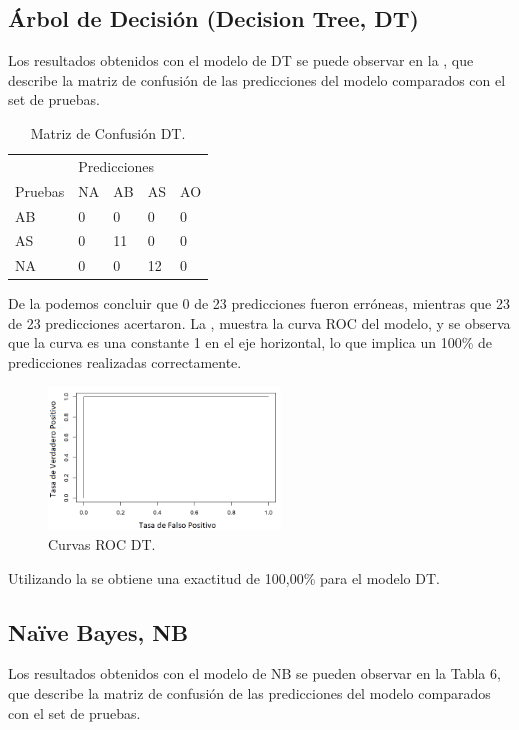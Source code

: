 \documentclass[spanish]{textolivre}
\begin{document}
\subsection{Árbol de Decisión (Decision Tree, DT)}
Los resultados obtenidos con el modelo de DT  se puede observar en la , que describe la matriz de confusión de las predicciones del modelo comparados con el set de pruebas.

\begin{table}[htpb]
\centering
\caption{Matriz de Confusión DT.}
\label{tab5}
\begin{tabular}{lllll}
\toprule 
 & \multicolumn{4}{l}{Predicciones}   \\ 
\cmidrule{2-5} 
Pruebas        & NA      & AB       & AS       & AO
\\ 
\midrule
AB             & 0       & 0        & 0        & 0
\\ 
AS             & 0       & 11       & 0        & 0
\\
NA             & 0       & 0        & 12       & 0
\\
\bottomrule
\end{tabular}
\end{table}

De la  podemos concluir que 0 de 23 predicciones fueron erróneas, mientras que 23 de 23 predicciones acertaron. La , muestra la curva ROC del modelo, y se observa que la curva es una constante 1 en el eje horizontal, lo que implica un 100\% de predicciones realizadas correctamente.

\begin{figure}[htbp]
 \centering
 \includegraphics[width=0.55\textwidth]{figura10.png}
 \caption{Curvas ROC DT.}
 \label{figura10}
\end{figure}

Utilizando la  se obtiene una exactitud de 100,00\% para el modelo DT.

\subsection{Naïve Bayes, NB}
Los resultados obtenidos con el modelo de NB  se pueden observar en la Tabla 6, que describe la matriz de confusión de las predicciones del modelo comparados con el set de pruebas.
\end{document}
